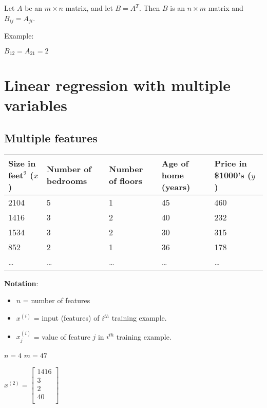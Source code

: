 \documentclass[a4paper]{report}
\begin{document}
        Let $A$ be an $m \times n$ matrix, and let $B = A^{T}$. Then $B$ is an $n \times m$ matrix and $B_{ij} = A_{ji}$.

        Example:

        $B_{12} = A_{21} = 2$

  \chapter{Linear regression with multiple variables}

    \section{Multiple features}

      \begin{center}
        \begin{tabular}{ | l | l | l | l | l | }
          \hline
          Size in feet$^2$ ($x$) & Number of bedrooms & Number of floors & Age of home (years) & Price in \$1000's ($y$) \\ \hline
          2104 & 5 & 1 & 45 & 460 \\ \hline
          1416 & 3 & 2 & 40 & 232 \\ \hline
          1534 & 3 & 2 & 30 & 315 \\ \hline
          852  & 2 & 1 & 36 & 178 \\ \hline
          \ldots & \ldots & \dots & \dots & \ldots \\ \hline
        \end{tabular}
      \end{center}

      \textbf{Notation}:
      \begin{itemize}
        \item $n$ = number of features
        \item $x^{(i)}$ = input (features) of $i^{th}$ training example.
        \item $x^{(i)}_{j}$ = value of feature $j$ in $i^{th}$ training example.
      \end{itemize}

      $n = 4$
      $m = 47$

      $x^{(2)} = 
      \begin{bmatrix}
        1416 \\
        3 \\
        2 \\
        40 \\
      \end{bmatrix}$
\end{document}

